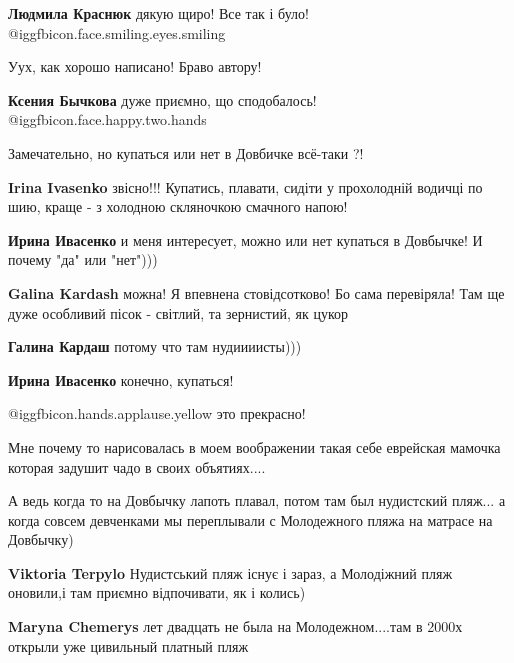 \begin{itemize}
\begin{itemize} %
\textbf{Людмила Краснюк} дякую щиро! Все так і було! @igg{fbicon.face.smiling.eyes.smiling} 
\end{itemize} %

Уух, как хорошо написано! Браво автору!

\textbf{Ксения Бычкова} дуже приємно, що сподобалось! @igg{fbicon.face.happy.two.hands} 

Замечательно, но купаться или нет в Довбичке всё-таки ?!

\begin{itemize} %
\textbf{Irina Ivasenko} звісно!!! Купатись, плавати, сидіти у прохолодній водичці по шию, краще - з холодною скляночкою смачного напою!

\textbf{Ирина Ивасенко} и меня интересует, можно или нет купаться в Довбычке! И почему "да" или "нет")))

\begin{itemize} %
\textbf{Galina Kardash} можна! Я впевнена стовідсотково! Бо сама перевіряла! Там ще дуже особливий пісок - світлий, та зернистий, як цукор

\textbf{Галина Кардаш} потому что там нудиииисты)))
\end{itemize} %

\textbf{Ирина Ивасенко} конечно, купаться!

\end{itemize} %

 @igg{fbicon.hands.applause.yellow}  это прекрасно!


Мне почему то нарисовалась в моем воображении такая себе еврейская мамочка
которая задушит чадо в своих объятиях....

А ведь когда то на Довбычку лапоть плавал, потом там был нудистский пляж... а
когда совсем девченками мы переплывали с Молодежного пляжа на матрасе на
Довбычку)

\begin{itemize} %
\textbf{Viktoria Terpylo} Нудистський пляж існує і зараз, а Молодіжний пляж оновили,і там приємно відпочивати, як і колись)

\textbf{Maryna Chemerys} лет двадцать не была на Молодежном....там в 2000х открыли уже цивильный платный пляж


\end{itemize}
\end{itemize}
